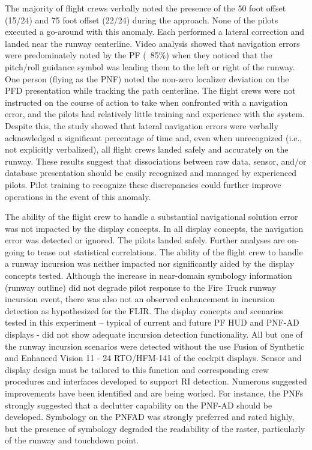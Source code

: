 \documentclass[utf8,bachelor,manualbib]{gradu3}
\begin{document}
The majority of flight crews verbally noted the presence of the 50 foot offset (15/24) and 75 foot offset
(22/24) during the approach. None of the pilots executed a go-around with this anomaly. Each performed a
lateral correction and landed near the runway centerline. Video analysis showed that navigation errors were
predominately noted by the PF (~85\%) when they noticed that the pitch/roll guidance symbol was leading
them to the left or right of the runway. One person (flying as the PNF) noted the non-zero localizer deviation
on the PFD presentation while tracking the path centerline.
The flight crews were not instructed on the course of action to take when confronted with a navigation error,
and the pilots had relatively little training and experience with the system. Despite this, the study showed that
lateral navigation errors were verbally acknowledged a significant percentage of time and, even when
unrecognized (i.e., not explicitly verbalized), all flight crews landed safely and accurately on the runway.
These results suggest that dissociations between raw data, sensor, and/or database presentation should be
easily recognized and managed by experienced pilots. Pilot training to recognize these discrepancies could
further improve operations in the event of this anomaly. \citep{baileyym2007}

The ability of the flight crew to handle a substantial navigational solution error was not impacted by the
display concepts. In all display concepts, the navigation error was detected or ignored. The pilots landed
safely. Further analyses are on-going to tease out statistical correlations.
The ability of the flight crew to handle a runway incursion was neither impacted nor significantly aided by the
display concepts tested. Although the increase in near-domain symbology information (runway outline) did
not degrade pilot response to the Fire Truck runway incursion event, there was also not an observed
enhancement in incursion detection as hypothesized for the FLIR. The display concepts and scenarios tested
in this experiment – typical of current and future PF HUD and PNF-AD displays - did not show adequate
incursion detection functionality. All but one of the runway incursion scenarios were detected without the use
Fusion of Synthetic and Enhanced Vision
11 - 24 RTO/HFM-141
of the cockpit displays. Sensor and display design must be tailored to this function and corresponding crew
procedures and interfaces developed to support RI detection.
Numerous suggested improvements have been identified and are being worked. For instance, the PNFs
strongly suggested that a declutter capability on the PNF-AD should be developed. Symbology on the PNFAD
was strongly preferred and rated highly, but the presence of symbology degraded the readability of the
raster, particularly of the runway and touchdown point. \citep{baileyym2007}
\end{document}
